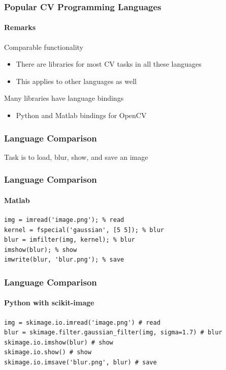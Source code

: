 \documentclass[xetex,professionalfont]{beamer}
\begin{document}

\begin{frame}
\frametitle{Popular CV Programming Languages}
\framesubtitle{Remarks}

Comparable functionality
\begin{itemize}
	\item There are libraries for most CV tasks in all these languages
	\item This applies to other languages as well
\end{itemize}

\bigskip
Many libraries have language bindings
\begin{itemize}
	\item Python and Matlab bindings for OpenCV
\end{itemize}

\end{frame}


\begin{frame}
\frametitle{Language Comparison}

Task is to load, blur, show, and save an image

\end{frame}


\begin{frame}[fragile]
\frametitle{Language Comparison}
\framesubtitle{Matlab}

\begin{verbatim}
img = imread('image.png'); % read
kernel = fspecial('gaussian', [5 5]); % blur
blur = imfilter(img, kernel); % blur
imshow(blur); % show
imwrite(blur, 'blur.png'); % save
\end{verbatim}

\end{frame}


\begin{frame}[fragile]
\frametitle{Language Comparison}
\framesubtitle{Python with scikit-image}

\begin{verbatim}
img = skimage.io.imread('image.png') # read
blur = skimage.filter.gaussian_filter(img, sigma=1.7) # blur
skimage.io.imshow(blur) # show
skimage.io.show() # show
skimage.io.imsave('blur.png', blur) # save
\end{verbatim}

\end{frame}
\end{document}
